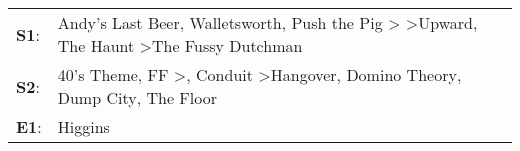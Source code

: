 \begin{supertabular}{p{0.03\textwidth}p{0.92\textwidth}}
 \textbf{S1}:  &    Andy's Last Beer\textsuperscript{}, \enspace Walletsworth\textsuperscript{}, \enspace Push the Pig\textsuperscript{} \textgreater {}\textsuperscript{} \textgreater \enspace Upward\textsuperscript{}, \enspace The Haunt\textsuperscript{} \textgreater \enspace The Fussy Dutchman\textsuperscript{}  \enspace  \\
 \textbf{S2}:  &  40's Theme\textsuperscript{}, \enspace FF\textsuperscript{} \textgreater {}\textsuperscript{}, \enspace Conduit\textsuperscript{} \textgreater \enspace Hangover\textsuperscript{}, \enspace Domino Theory\textsuperscript{}, \enspace Dump City\textsuperscript{}, \enspace The Floor\textsuperscript{}  \enspace  \\
 \textbf{E1}:  &                                                                                                                                                                                                                                                                                            Higgins\textsuperscript{}  \enspace  \\
\end{supertabular}

